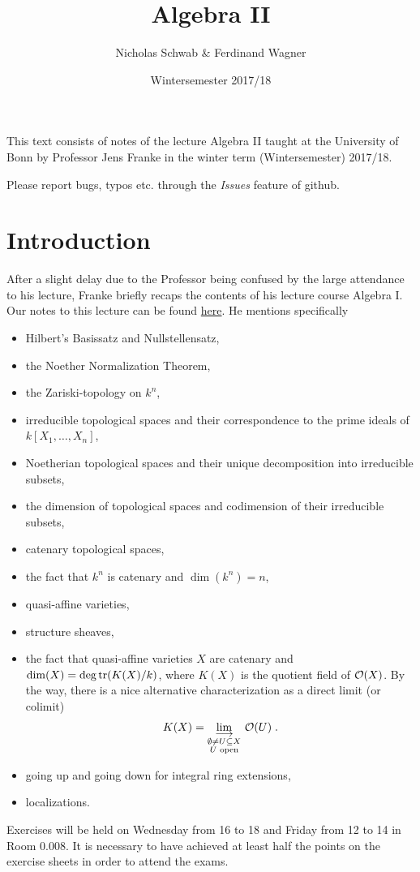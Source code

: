 \documentclass[a4paper,parskip=full,numbers=enddot]{scrreprt}
\title{Algebra II}
\author{Nicholas Schwab \& Ferdinand Wagner}
\date{Wintersemester 2017/18}
\begin{document}
\maketitle
{}
 
This text consists of notes of the lecture Algebra II taught at the University of Bonn by Professor Jens Franke in the winter term (Wintersemester) 2017/18. 

Please report bugs, typos etc. through the \emph{Issues} feature of github.

\tableofcontents

\chapter*{Introduction}
After a slight delay due to the Professor being confused by the large attendance to his lecture, Franke briefly recaps the contents of his lecture course Algebra I. Our notes to this lecture can be found \href{https://github.com/Nicholas42/AlgebraFranke/tree/master/AlgebraI}{here}\cite{alg1}. He mentions specifically
\begin{itemize}
 \item Hilbert's Basissatz and Nullstellensatz,
 \item the Noether Normalization Theorem,
 \item the Zariski-topology on $k^n$,
 \item irreducible topological spaces and their correspondence to the prime ideals of $k[X_1, \ldots, X_n]$,
 \item Noetherian topological spaces and their unique decomposition into irreducible subsets,
 \item the dimension of topological spaces and codimension of their irreducible subsets,
 \item catenary topological spaces,
 \item the fact that $k^n$ is catenary and $\dim(k^n) = n$,
 \item quasi-affine varieties,
 \item structure sheaves,
 \item the fact that quasi-affine varieties $X$ are catenary and $\dim(X) = \deg\operatorname{tr}(K(X)/k)$, where $K(X)$ is the quotient field of $\mathcal{O}(X)$. By the way, there is a nice alternative characterization as a direct limit (or colimit)
 \begin{align*}
 	K(X)=\colimit[\substack{\emptyset\not=U\subseteq X\\U\text{ open}}]\Oo(U)\;.
 \end{align*}
 \item going up and going down for integral ring extensions,
 \item localizations.
\end{itemize}
Exercises will be held on Wednesday from 16 to 18 and Friday from 12 to 14 in Room 0.008. It is necessary to have achieved at least half the points on the exercise sheets in order to attend the exams.
\end{document}

